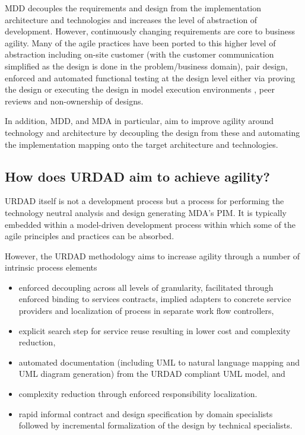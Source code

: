MDD decouples the requirements and design from the implementation architecture
and technologies and increases the level of abstraction of development.
However, continuously changing requirements are core to business agility.
Many of the agile practices have been ported to this higher level of abstraction
including on-site customer (with the customer communication simplified
as the design is done in the problem/business domain), pair design,
enforced and automated functional testing at the design level either via
proving the design or executing the design in model execution environments
\cite{kirshin:umlGenericModelExecutionEngine},
peer reviews and non-ownership of designs.

In addition, MDD, and MDA in particular, aim to improve agility around technology
and architecture by decoupling the design from these and automating the
implementation mapping onto the target architecture and technologies.


\subsection{How does URDAD aim to achieve agility?}

URDAD itself is not a development process but a process for performing
the technology neutral analysis and design generating MDA's PIM. It is
typically embedded within a model-driven development process within
which some of the agile principles and practices can be absorbed. 

However, the URDAD methodology aims to increase
agility through a number of intrinsic process elements
\begin{itemize}
  \item enforced decoupling across all levels of granularity, facilitated
			through enforced binding to services contracts, implied adapters
			to concrete service providers and localization of process in
			separate work flow controllers,
  \item explicit search step for service reuse resulting in lower cost and complexity reduction, 
  \item automated documentation (including UML to natural language mapping
			and UML diagram generation) from the URDAD compliant UML model, and
  \item complexity reduction through enforced responsibility localization.
  \item rapid informal contract and design specification by domain specialists followed by
incremental formalization of the design by technical specialists.
\end{itemize}

